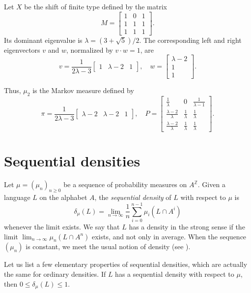 \documentclass{article}[11pt]
\newcommand{\Z}{\mathbb{Z}}
\numberwithin{theorem}{section}
\numberwithin{equation}{section}
\numberwithin{figure}{section}
\numberwithin{table}{section}
\begin{document}
\begin{example}\label{exampleMeasureMaxEntropy}
Let $X$ be the shift of finite type defined by the matrix 
\[M=\begin{bmatrix}1&0&1\\1&1&1\\1&1&1\end{bmatrix}.\]
Its dominant eigenvalue is $\lambda=(3+\sqrt{5})/2$.
The corresponding left and right eigenvectors $v$ and $w$, normalized by $v\cdot w=1$, are
\[v=\frac{1}{2\lambda-3}\begin{bmatrix}1&\lambda-2&1\end{bmatrix},\quad w=\begin{bmatrix}\lambda-2\\1\\1\end{bmatrix}.\]

Thus, $\mu_2$ is the Markov measure defined by
\[\pi=\frac{1}{2\lambda-3}\begin{bmatrix}\lambda-2&\lambda-2&1\end{bmatrix},\quad
P=\begin{bmatrix}\frac{1}{\lambda}&0&\frac{1}{\lambda-1}\\\frac{\lambda-2}{\lambda}&\frac{1}{\lambda}&\frac{1}{\lambda}\\
\frac{\lambda-2}{\lambda}&\frac{1}{\lambda}&\frac{1}{\lambda}\end{bmatrix}.\]
\end{example}


\section{Sequential densities}\label{sectionSequential}

Let $\mu=(\mu_n)_{n\ge 0}$ be a sequence of probability measures
on $A^\Z$. Given a language $L$ on the alphabet $A$, the \emph{sequential density}
of $L$ with respect to $\mu$ is
\[\delta_\mu(L)=\lim_{n\to\infty}\frac{1}{n}\sum_{i=0}^{n-1}\mu_i(L\cap A^i)\]
whenever the limit exists. We say that $L$ has a density in the strong
sense if the limit $\lim_{n\to\infty}\mu_n(L\cap A^n)$ exists, and not only
in average.
When the sequence $(\mu_n)$ is constant, we meet the usual notion of density (see \cite{BertheGouletOuelletNybergBroddaPerrinPetersen2024}).

Let us list a few elementary properties of sequential densities, which are actually the same for ordinary densities.
If $L$ has a sequential density with respect to $\mu$, then $0\le \delta_\mu(L)\le 1$.
\end{document}
